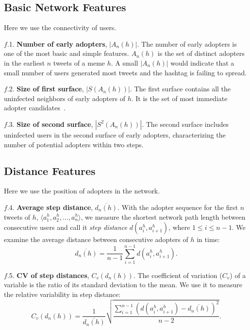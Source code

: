\documentclass[letterpaper]{article}
\begin{document}
\subsection{Basic Network Features}

Here we use the connectivity of users.


\noindent $f$.1. \textbf{Number of early adopters}, $|A_n(h)|$.
The number of early adopters is one of the most basic and simple features.
$A_n(h)$ is the set of distinct adopters in the earliest $n$ tweets of a meme $h$.
A small $|A_n(h)|$ would indicate that a small number of users generated most tweets and the hashtag is failing to spread.


\noindent $f$.2. \textbf{Size of first surface}, $| S(A_n(h)) |$. The first surface contains all the uninfected neighbors of early adopters of $h$. It is the set of most immediate adopter candidates~\cite{ma2013predicting}.


\noindent $f$.3. \textbf{Size of second surface}, $| S^2(A_n(h))  |$. The second surface includes uninfected users in the second surface of early adopters, characterizing the number of potential adopters within two steps.


\subsection{Distance Features}

Here we use the position of adopters in the network.


\noindent $f$.4. \textbf{Average step distance}, $\overline{d_n(h)}$.  With the
adopter sequence for the first $n$ tweets of $h$, $\langle
a_1^h, a_2^h, \dots, a_n^h \rangle$, we measure the
shortest network path length between consecutive users
and call it \emph{step distance} $d(a_i^h, a_{i+1}^h)$, where $1 \leq
i \leq n-1$.
We examine the average distance between consecutive adopters of $h$ in time:
\begin{equation*}
\overline{d_n(h)} = \frac{1}{n-1} \sum_{i=1}^{n-1} d(a_i^h, a_{i+1}^h).
\end{equation*}


\noindent $f$.5. \textbf{CV of step distances}, $C_v(d_n(h))$.  The coefficient of
variation ($C_v$) of a variable is the ratio of its standard deviation to the
mean. We use it to measure the relative variability in step distance:
\begin{equation*}
C_v(d_n(h)) = \frac{1}{\overline{d_n(h)}} \sqrt{\frac{\sum_{i=1}^{n-1}(d(a_i^h,
a_{i+1}^h) - \overline{d_n(h)})^2}{n-2}}.
\end{equation*}
\end{document}
